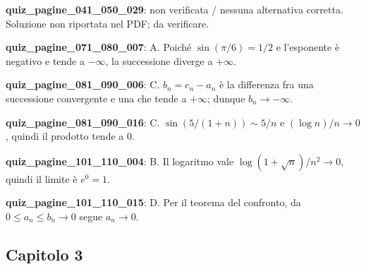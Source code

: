 \documentclass[11pt,a4paper]{article}
\newcounter{quiz}
\begin{document}
\noindent\textbf{quiz\_pagine\_041\_050\_029}: non verificata / nessuna alternativa corretta. Soluzione non riportata nel PDF; da verificare.\par\medskip
\noindent\textbf{quiz\_pagine\_071\_080\_007}: A. Poiché $\sin(\pi/6)=1/2$ e l'esponente è negativo e tende a $-\infty$, la successione diverge a $+\infty$.\par\medskip
\noindent\textbf{quiz\_pagine\_081\_090\_006}: C. $b_n=c_n-a_n$ è la differenza fra una successione convergente e una che tende a $+\infty$; dunque $b_n\to-\infty$.\par\medskip
\noindent\textbf{quiz\_pagine\_081\_090\_016}: C. $\sin(5/(1+n))\sim5/n$ e $(\log n)/n\to0$, quindi il prodotto tende a $0$.\par\medskip
\noindent\textbf{quiz\_pagine\_101\_110\_004}: B. Il logaritmo vale $\log(1+\sqrt n)/n^2\to0$, quindi il limite è $e^0=1$.\par\medskip
\noindent\textbf{quiz\_pagine\_101\_110\_015}: D. Per il teorema del confronto, da $0\leq a_n\leq b_n\to0$ segue $a_n\to0$.\par\medskip
\subsection*{Capitolo 3}
\end{document}
